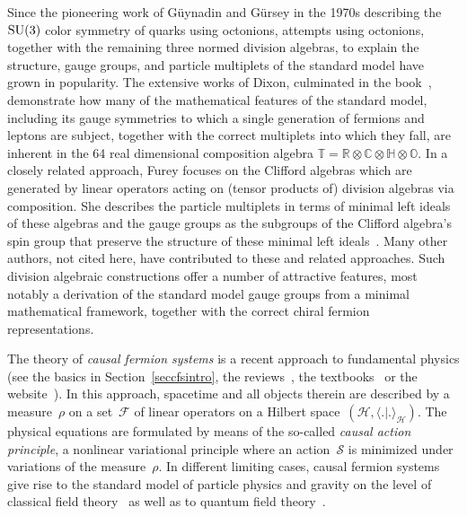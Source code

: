 \documentclass[reqno,11pt]{amsart}
\numberwithin{equation}{section}
\newcommand{\la}{\langle}
\newcommand{\ra}{\rangle}
\newcommand{\1}{\mbox{\rm 1 \hspace{-1.05 em} 1}}
\renewcommand{\H}{\mathscr{H}}
\newcommand{\SU}{{\rm{SU}}}
\newcommand{\F}{{\mathscr{F}}}
\newcommand{\Sact}{{\mathcal{S}}}
\newcommand{\bb}[1]{\mathbb{#1}}
\begin{document}
Since the pioneering work of G\"uynadin and G\"ursey in the 1970s describing the~$\SU(3)$ color symmetry of quarks using octonions, attempts using octonions, together with the remaining three normed division algebras, to explain the structure, gauge groups, and particle multiplets of the standard model have grown in popularity. The extensive works of Dixon, culminated in the book~\cite{dixon2013division}, demonstrate how many of the mathematical features of the standard model, including its gauge symmetries to which a single generation of fermions and leptons are subject, together with the correct multiplets into which they fall, are inherent in the 64 real dimensional composition algebra
$\bb{T}=\mathbb{R}\otimes\mathbb{C}\otimes\mathbb{H}\otimes\mathbb{O}$. In a closely related approach, Furey focuses on the Clifford algebras which are generated by
linear operators acting on (tensor products of) division algebras via composition.
She describes the particle multiplets in terms of minimal left ideals of these algebras and the gauge groups as the subgroups of the Clifford algebra's spin group that preserve the structure of these minimal left ideals~\cite{furey2016standard,furey231,furey232}. Many other authors, not cited here, have contributed to these and related approaches. Such division algebraic constructions offer a number of attractive features, most notably a derivation of the standard model gauge groups from a minimal mathematical framework, together with the correct chiral fermion representations.

The theory of {\em{causal fermion systems}} is a recent approach to fundamental physics
(see the basics in Section~\ref{seccfsintro}, the reviews~\cite{dice2014, nrstg, review}, the textbooks~\cite{cfs, intro}
or the website~\cite{cfsweblink}).
In this approach, spacetime and all objects therein are described by a measure~$\rho$
on a set~$\F$ of linear operators on a Hilbert space~$(\H, \la .|. \ra_\H)$. 
The physical equations are formulated by means of the so-called {\em{causal action principle}},
a nonlinear variational principle where an action~$\Sact$ is minimized under variations of the measure~$\rho$.
In different limiting cases, causal fermion systems give rise to the standard model of particle physics
and gravity on the level of classical field theory~\cite{cfs} as well as to quantum field
theory~\cite{fockfermionic, fockentangle, fockdynamics}.
\end{document}
